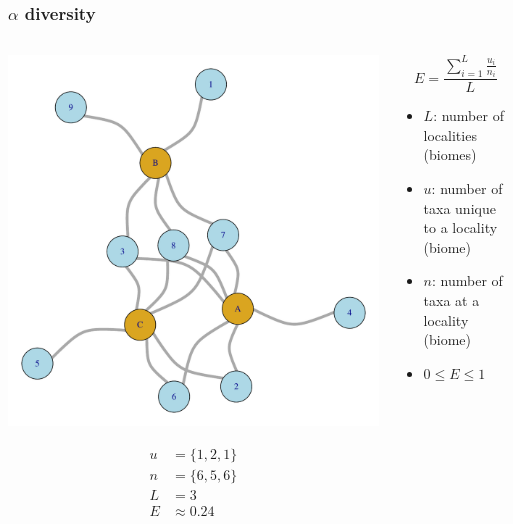 \documentclass{beamer}
\begin{document}
\begin{frame}
  \frametitle{\(\alpha\) diversity}

  \begin{columns}
    \begin{column}{0.6\textwidth}
      \begin{center}
        \includegraphics[height = 0.5\textheight, width = \textwidth, keepaspectratio = true]{figure/sim_graph}

        \begin{align*}
          u &= \{1, 2, 1\}\\
          n &= \{6, 5, 6\}\\
          L &= 3\\
          E &\approx 0.24
        \end{align*}
      \end{center}
    \end{column}
    \begin{column}{0.4\textwidth}
      \[
        E = \frac{\sum_{i = 1}^{L} \frac{u_{i}}{n_{i}}}{L}
      \]

      \begin{itemize}
        \item \(L\): number of localities (biomes)
        \item \(u\): number of taxa unique to a locality (biome)
        \item \(n\): number of taxa at a locality (biome)
        \item \(0 \leq E \leq 1\)
      \end{itemize}
    \end{column}
  \end{columns}
\end{frame}
\end{document}

